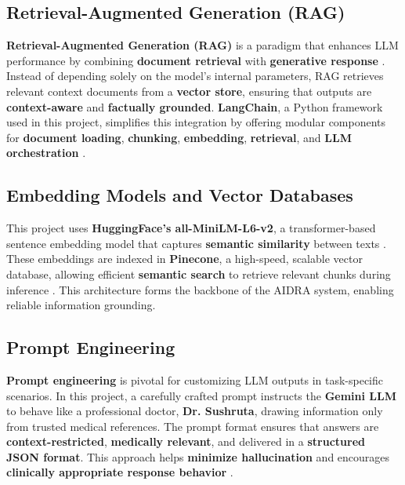\documentclass[12pt,a4paper]{report}
\newcommand{\titleKey}{AIDRA}
\begin{document}
\subsection{Retrieval-Augmented Generation (RAG)}
\label{subsec:rag}

\textbf{Retrieval-Augmented Generation (RAG)} is a paradigm that enhances LLM performance by combining \textbf{document retrieval} with \textbf{generative response} \cite{langchain}. Instead of depending solely on the model's internal parameters, RAG retrieves relevant context documents from a \textbf{vector store}, ensuring that outputs are \textbf{context-aware} and \textbf{factually grounded}. \textbf{LangChain}, a Python framework used in this project, simplifies this integration by offering modular components for \textbf{document loading}, \textbf{chunking}, \textbf{embedding}, \textbf{retrieval}, and \textbf{LLM orchestration} \cite{langchain}.

\subsection{Embedding Models and Vector Databases}
\label{subsec:embeddings-vectors}

This project uses \textbf{HuggingFace’s all-MiniLM-L6-v2}, a transformer-based sentence embedding model that captures \textbf{semantic similarity} between texts \cite{sentence_transformers}. These embeddings are indexed in \textbf{Pinecone}, a high-speed, scalable vector database, allowing efficient \textbf{semantic search} to retrieve relevant chunks during inference \cite{pinecone}. This architecture forms the backbone of the \titleKey{} system, enabling reliable information grounding.

\subsection{Prompt Engineering}
\label{subsec:prompt-engineering}

\textbf{Prompt engineering} is pivotal for customizing LLM outputs in task-specific scenarios. In this project, a carefully crafted prompt instructs the \textbf{Gemini LLM} to behave like a professional doctor, \textbf{Dr. Sushruta}, drawing information only from trusted medical references. The prompt format ensures that answers are \textbf{context-restricted}, \textbf{medically relevant}, and delivered in a \textbf{structured JSON format}. This approach helps \textbf{minimize hallucination} and encourages \textbf{clinically appropriate response behavior} \cite{hallucination_survey}.
\end{document}
